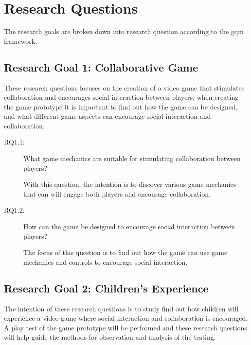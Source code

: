 

\section{Research Questions}
The research goals are broken down into research question according to the \gls{gqm} framework.
\subsection{Research Goal 1: Collaborative Game}
These research questions focuses on the creation of a video game that stimulates collaboration and encourages social interaction between players. when creating the game prototype it is important to find out how the game can be designed, and what different game aspects can encourage social interaction and collaboration.

\begin{description}
	\item[RQ1.1:] What game mechanics are suitable for stimulating collaboration between players?
	
	With this question, the intention is to discover various game mechanics that can will engage both players and encourage collaboration.
	
	\item[RQ1.2:] How can the game be designed to encourage social interaction between players?
		
	The focus of this question is to find out how the game can use game mechanics and controls to encourage social interaction.
	
\end{description}

\subsection{Research Goal 2: Children's Experience}
The intention of these research questions is to study find out how children will experience a video game where social interaction and collaboration is encouraged. A play test of the game prototype will be performed and these research questions will help guide the methods for observation and analysis of the testing.

